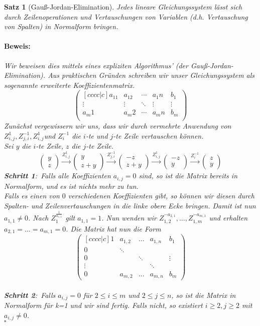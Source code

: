 \documentclass{report}
\newcommand{\vtwo}[2]{\begin{pmatrix}#1 \\ #2 \end{pmatrix}}
\theoremstyle{customrem}
\theoremstyle{customdef}
\newtheorem{satz}[definition]{Satz}
\renewenvironment{proof}{\vspace{-.75cm}\paragraph{Beweis: }}{\hfill$\square$}
\begin{document}
	\begin{satz}[Gauß-Jordan-Elimination]
		Jedes lineare Gleichungssystem lässt sich durch Zeilenoperationen und Vertauschungen von Variablen (d.h. Vertauschung von Spalten) in Normalform bringen.\\[.5cm]
		\begin{proof}
			Wir beweisen dies mittels eines expliziten  Algorithmus' (der Gauß-Jordan-Elimination).	Aus praktischen Gründen schreiben wir unser Gleichungssystem als sogenannte erweiterte Koeffizientenmatrix.
			$$
			\begin{pmatrix}[cccc|c]
				a_11   & a_12   & \cdots & a_1n   & b_1\\
				\vdots & \vdots & \ddots & \vdots & \vdots\\
				a_m1   & a_m2   & \cdots & a_mn   & b_m\\
			\end{pmatrix}
			$$
			Zunächst vergewissern wir uns, dass wir durch vermehrte Anwendung von $Z_{i,j}^1, Z_{j,i}^{-1}, Z_{i,j}^1$und $ Z_{i}^{-1}$ die $i$-te und $j$-te Zeile vertauschen können.\\
			Sei $y$ die $i$-te Zeile, $z$ die $j$-te Zeile.
			$$
			\vtwo{y}{z} \overset{Z_{i,j}^1}{\longrightarrow}  \vtwo{y}{z+y} \overset{Z_{j, i}^{-1}}{\longrightarrow}  \vtwo{-z}{z+y} \overset{Z_{i,j}^1}{\longrightarrow}  \vtwo{-z}{y} \overset{Z_{i}^{-1}}{\longrightarrow} \vtwo{z}{y}
			$$
			\textbf{Schritt 1}:\ Falls alle Koeffizienten $a_{i,j}=0$ sind, so ist die Matrix bereits in Normalform, und es ist nichts mehr zu tun.\\
			Falls es einen von $0$ verschiedenen Koeffizienten gibt, so können wir diesen durch Spalten- und Zeilenvertauschungen in die linke obere Ecke bringen. Damit ist nun $a_{1,1} \neq 0$. Nach $Z_{1}^{\frac{1}{a_{1,1}}}$ gilt $a_{1,1} = 1$. Nun wenden wir $Z_{1,2}^{-a_{2,1}}, \dots, Z_{1,m}^{-a_{m,1}}$ und erhalten $a_{2,1} = \dots = a_{m,1} = 0$.
			Die Matrix hat nun die Form $$
			\begin{pmatrix}[cccc|c]
			1 & a_{1, 2} & \dots   & a_{1, n}   & b_1\\
			0 & \ddots 	 &		   &			& \\
			0 & 		 & \ddots\ &			& \vdots\\
			\vdots&		 &		   & \ddots\	&\\
			0 & a_{m, 2} & \dots   & a_{m, n}   & b_m
			\end{pmatrix}
			$$\\
			\textbf{Schritt 2}:\ Falls $a_{i,j} = 0$ für $2 \le i \le m$ und $2 \le j \le n$, so ist die Matrix in Normalform für k=1 und wir sind fertig. Falls nicht, so existiert $i \ge 2, j\ge 2$ mit $a_{i,j} \neq 0$.\\

\end{proof}
\end{satz}
\end{document}

